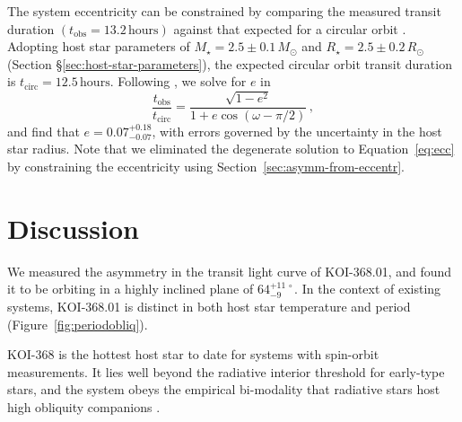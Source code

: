 \documentclass[iop]{emulateapj}
\begin{document}
The system eccentricity can be constrained by comparing the measured
transit duration $(t_\text{obs}=13.2\,\text{hours})$ against that expected for a circular
orbit \citep[e.g.][]{Barnes2007,Burke2008,Kane2012}. Adopting host star
parameters of $M_\star = 2.5\pm0.1\,M_\odot$ and $R_\star = 2.5\pm0.2\,R_\odot$
(Section \S\ref{sec:host-star-parameters}), the expected circular orbit 
transit duration is $t_\text{circ} =12.5\,\text{hours}$. Following 
\citet{Burke2008}, we solve for $e$ in
\begin{equation}
  \label{eq:ecc}
  \frac{t_\text{obs}}{t_\text{circ}} = \frac{\sqrt{1-e^2}}{1+e \cos(\omega-\pi/2)}\,,
\end{equation}
and find that $e = 0.07^{+0.18}_{-0.07}$, with errors governed by the uncertainty in the host star radius. Note that we eliminated the degenerate solution to Equation~\ref{eq:ecc} by constraining the eccentricity using Section~\ref{sec:asymm-from-eccentr}. 

\section{Discussion}
\label{sec:discussion}

We measured the asymmetry in the transit light curve of KOI-368.01, and found it to be orbiting in a highly 
inclined plane of $64_{-9} ^{+11\,\circ}$. In the context of existing systems, KOI-368.01 is distinct in 
both host star temperature and period (Figure~\ref{fig:periodobliq}). 

KOI-368 is the hottest host star to date for systems with spin-orbit measurements. It lies well beyond the radiative interior threshold for early-type stars, and the system obeys the empirical bi-modality that radiative stars host high obliquity companions \citep{Winn:2010}. 
\end{document}
